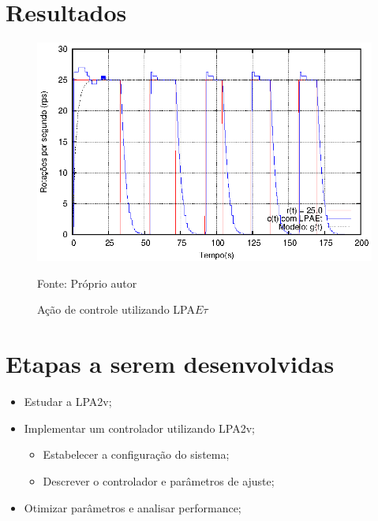 \newpage


\section{Resultados}



\begin{figure}[!htb]
\caption{Ação de controle utilizando LPA$E\tau$}
\vspace{-1cm}\center\includegraphics[scale=1.6]{./imagens/LPAEt-delta.eps}
\label{fig:acaoLPAEtDelta}

{\small Fonte: Próprio autor}
\end{figure}







\section{Etapas a serem desenvolvidas}

\begin{itemize}
\item Estudar a LPA2v;
\item Implementar um controlador utilizando LPA2v;
	\begin{itemize}
	\item Estabelecer a configuração do sistema;
	\item Descrever o controlador e parâmetros de ajuste;
	\end{itemize}
\item Otimizar parâmetros e analisar performance;
\end{itemize}


